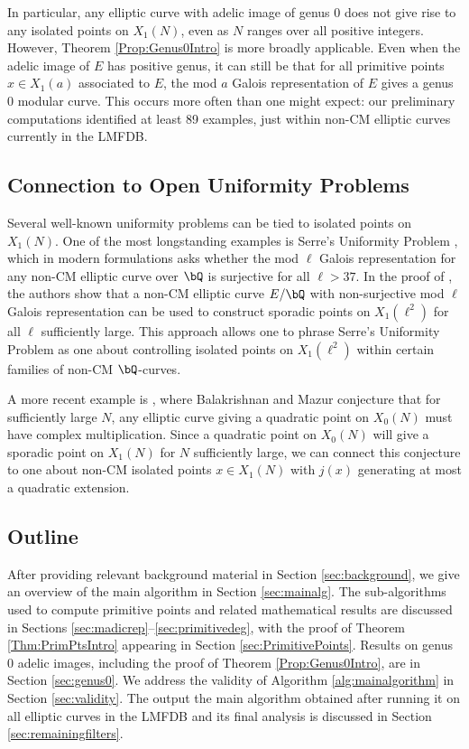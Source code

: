 \documentclass[11pt,reqno]{amsart}
\theoremstyle{plain}
\theoremstyle{definition}
\newcommand{\Q}{\bQ}
\begin{document}
\noindent In particular, any elliptic curve with adelic image of genus 0 does not give rise to any isolated points on $X_1(N)$, even as $N$ ranges over all positive integers. However, Theorem \ref{Prop:Genus0Intro} is more broadly applicable. Even when the adelic image of $E$ has positive genus, it can still be that for all primitive points $x \in X_1(a)$ associated to $E$, the mod $a$ Galois representation of $E$ gives a genus 0 modular curve. This occurs more often than one might expect: our preliminary computations identified at least 89 examples, just within non-CM elliptic curves currently in the LMFDB.

\subsection{Connection to Open Uniformity Problems}\label{sec:UniformityConnections} Several well-known uniformity problems can be tied to isolated points on $X_1(N)$. One of the most longstanding examples is Serre's Uniformity Problem \cite[\S\,4.3]{serre72}, which in modern formulations \cite{sutherland,ZywinaImages} asks whether the mod $\ell$ Galois representation for any non-CM elliptic curve over $\Q$ is surjective for all $\ell>37$. In the proof of \cite[Theorem~1.3]{BourdonNajman2021}, the authors show that a non-CM elliptic curve $E/\Q$ with non-surjective mod $\ell$ Galois representation can be used to construct sporadic points on $X_1(\ell^2)$ for all $\ell$ sufficiently large. This approach allows one to phrase Serre's Uniformity Problem as one about controlling isolated points on $X_1(\ell^2)$ within certain families of non-CM $\Q$-curves.

A more recent example is \cite[Conjecture 17]{BalakrishnanMazur23}, where Balakrishnan and Mazur conjecture that for sufficiently large $N$, any elliptic curve giving a quadratic point on $X_0(N)$ must have complex multiplication. Since a quadratic point on $X_0(N)$ will give a sporadic point on $X_1(N)$ for $N$ sufficiently large, we can connect this conjecture to one about non-CM isolated points $x \in X_1(N)$ with $j(x)$ generating at most a quadratic extension.

\subsection{Outline}
After providing relevant background material in Section \ref{sec:background}, we give an overview of the main algorithm in Section \ref{sec:mainalg}. The sub-algorithms used to compute primitive points and related mathematical results are discussed in Sections \ref{sec:madicrep}--\ref{sec:primitivedeg}, with the proof of Theorem \ref{Thm:PrimPtsIntro} appearing in Section \ref{sec:PrimitivePoints}. Results on genus 0 adelic images, including the proof of Theorem \ref{Prop:Genus0Intro}, are in Section \ref{sec:genus0}.  We address the validity of Algorithm \ref{alg:mainalgorithm} in Section \ref{sec:validity}. The output the main algorithm obtained after running it on all elliptic curves in the LMFDB and its final analysis is discussed in Section \ref{sec:remainingfilters}.
\end{document}
